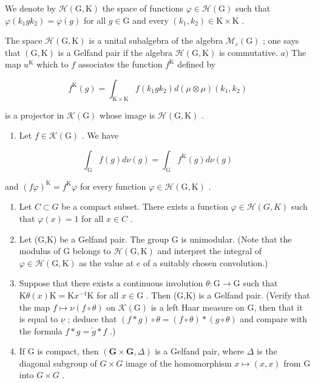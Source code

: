 We denote by \(\mathcal{H}(\mathrm{G},\mathrm{K})\) the space of functions \(\varphi \in \mathcal{H}(\mathrm{G})\) such that \(\varphi (k_1gk_2) = \varphi (g)\) for all \(g\in \mathrm{G}\) and every \((k_{1},k_{2})\in \mathrm{K}\times \mathrm{K}\) .

The space \(\mathcal{H}(\mathrm{G},\mathrm{K})\) is a unital subalgebra of the algebra \(\mathcal{M}_c(\mathrm{G})\) ; one says that \((\mathrm{G},\mathrm{K})\) is a Gelfand pair if the algebra \(\mathcal{H}(\mathrm{G},\mathrm{K})\) is commutative. \(a)\) The map \(u^{\mathrm{K}}\) which to \(f\) associates the function \(f^{\mathrm{K}}\) defined by

\[
f ^ {\mathrm{K}} (g) = \int_ {\mathrm{K} \times \mathrm{K}} f (k _ {1} g k _ {2}) d (\mu \otimes \mu) (k _ {1}, k _ {2})
\]

is a projector in \(\mathcal{K}(\mathrm{G})\) whose image is \(\mathcal{H}(\mathrm{G},\mathrm{K})\) .

\begin{enumerate}
\def\labelenumi{\alph{enumi})}
\setcounter{enumi}{1}
\tightlist
\item
  Let \(f\in \mathcal{K}(\mathrm{G})\) . We have
\end{enumerate}

\[
\int_ {\mathrm{G}} f (g) d \nu (g) = \int_ {\mathrm{G}} f ^ {\mathrm{K}} (g) d \nu (g)
\]

and \((f\varphi)^{\mathrm{K}} = f^{\mathrm{K}}\varphi\) for every function \(\varphi \in \mathcal{H}(\mathrm{G},\mathrm{K})\) .

\begin{enumerate}
\def\labelenumi{\alph{enumi})}
\setcounter{enumi}{2}
\item
  Let \(C \subset G\) be a compact subset. There exists a function \(\varphi \in \mathcal{H}(G, K)\) such that \(\varphi(x) = 1\) for all \(x \in C\) .
\item
  Let (G,K) be a Gelfand pair. The group G is unimodular. (Note that the modulus of G belongs to \(\mathcal{H}(\mathrm{G},\mathrm{K})\) and interpret the integral of \(\varphi \in \mathcal{H}(\mathrm{G},\mathrm{K})\) as the value at \(e\) of a suitably chosen convolution.)
\item
  Suppose that there exists a continuous involution \(\theta\colon\mathrm{G}\to\mathrm{G}\) such that \(\mathrm{K}\theta(x)\mathrm{K}=\mathrm{K}x^{-1}\mathrm{K}\) for all \(x\in\mathrm{G}\) . Then (G,K) is a Gelfand pair. (Verify that the map \(f\mapsto\nu(f\circ\theta)\) on \(\mathcal{K}(\mathrm{G})\) is a left Haar measure on G, then that it is equal to \(\underline{\nu}\) ; deduce that \((f*g)\circ\theta=(f\circ\theta)*(g\circ\theta)\) and compare with the formula \(f*g=\check{g}*f\) .)
\item
  If G is compact, then \((\mathbf{G} \times \mathbf{G}, \Delta)\) is a Gelfand pair, where \(\Delta\) is the diagonal subgroup of \(G \times G\) image of the homomorphism \(x \mapsto (x, x)\) from G into \(G \times G\) .
\end{enumerate}

